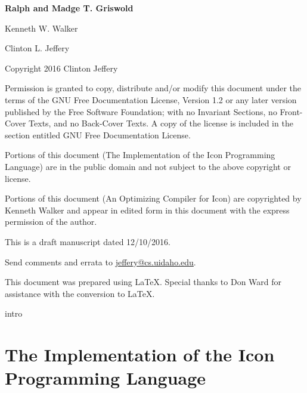 \documentclass[letterpaper,twoside,12pt]{book}
\begin{document}
\bigskip
\bigskip
\bigskip
\bigskip
\bigskip
\bigskip
\bigskip

{\raggedleft\bfseries\Large
Ralph and Madge T. Griswold
\par
Kenneth W. Walker
\par
Clinton L. Jeffery 
\par}

\bigskip
\bigskip
\bigskip

\clearpage\setcounter{page}{1}\pagestyle{KonvertFolgeii}
\frontmatter
\bigskip
\bigskip
\noindent Copyright {\textcopyright} 2016 Clinton Jeffery


\noindent Permission is granted to copy, distribute and/or modify this
document under the terms of the GNU Free Documentation License,
Version 1.2 or any later version published by the Free Software
Foundation; with no Invariant Sections, no Front-Cover Texts, and no
Back-Cover Texts. A copy of the license is included in the section
entitled {\textquotedbl}GNU Free Documentation License{\textquotedbl}.

\noindent Portions of this document ({\textquotedbl}The Implementation
of the Icon Programming Language{\textquotedbl}) are in the public
domain and not subject to the above copyright or license.

\noindent Portions of this document ({\textquotedbl}An Optimizing
Compiler for Icon{\textquotedbl}) are copyrighted by Kenneth Walker
and appear in edited form in this document with the express permission
of the author.


\bigskip


\noindent This is a draft manuscript dated 12/10/2016.

\noindent Send comments and errata to
\href{mailto:jeffery@cs.uidaho.edu}{jeffery@cs.uidaho.edu}.

\bigskip

\noindent This document was prepared using \LaTeX. Special thanks to Don Ward
for assistance with the conversion to \LaTeX.

\setcounter{tocdepth}{3}
\tableofcontents


\mainmatter
 {intro}

\part{The Implementation of the Icon Programming Language}













\end{document}
